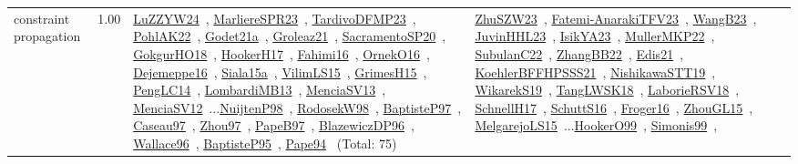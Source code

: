 {\begin{longtable}{p{3cm}r>{\raggedright\arraybackslash}p{6cm}>{\raggedright\arraybackslash}p{6cm}>{\raggedright\arraybackslash}p{8cm}}
\index{constraint propagation}\index{CP!constraint propagation}constraint propagation &  1.00 & \href{../works/LuZZYW24.pdf}{LuZZYW24}~\cite{LuZZYW24}, \href{../works/MarliereSPR23.pdf}{MarliereSPR23}~\cite{MarliereSPR23}, \href{../works/TardivoDFMP23.pdf}{TardivoDFMP23}~\cite{TardivoDFMP23}, \href{../works/PohlAK22.pdf}{PohlAK22}~\cite{PohlAK22}, \href{../works/Godet21a.pdf}{Godet21a}~\cite{Godet21a}, \href{../works/Groleaz21.pdf}{Groleaz21}~\cite{Groleaz21}, \href{../works/SacramentoSP20.pdf}{SacramentoSP20}~\cite{SacramentoSP20}, \href{../works/GokgurHO18.pdf}{GokgurHO18}~\cite{GokgurHO18}, \href{../works/HookerH17.pdf}{HookerH17}~\cite{HookerH17}, \href{../works/Fahimi16.pdf}{Fahimi16}~\cite{Fahimi16}, \href{../works/OrnekO16.pdf}{OrnekO16}~\cite{OrnekO16}, \href{../works/Dejemeppe16.pdf}{Dejemeppe16}~\cite{Dejemeppe16}, \href{../works/Siala15a.pdf}{Siala15a}~\cite{Siala15a}, \href{../works/VilimLS15.pdf}{VilimLS15}~\cite{VilimLS15}, \href{../works/GrimesH15.pdf}{GrimesH15}~\cite{GrimesH15}, \href{../works/PengLC14.pdf}{PengLC14}~\cite{PengLC14}, \href{../works/LombardiMB13.pdf}{LombardiMB13}~\cite{LombardiMB13}, \href{../works/MenciaSV13.pdf}{MenciaSV13}~\cite{MenciaSV13}, \href{../works/MenciaSV12.pdf}{MenciaSV12}~\cite{MenciaSV12}...\href{../works/NuijtenP98.pdf}{NuijtenP98}~\cite{NuijtenP98}, \href{../works/RodosekW98.pdf}{RodosekW98}~\cite{RodosekW98}, \href{../works/BaptisteP97.pdf}{BaptisteP97}~\cite{BaptisteP97}, \href{../works/Caseau97.pdf}{Caseau97}~\cite{Caseau97}, \href{../works/Zhou97.pdf}{Zhou97}~\cite{Zhou97}, \href{../works/PapeB97.pdf}{PapeB97}~\cite{PapeB97}, \href{../works/BlazewiczDP96.pdf}{BlazewiczDP96}~\cite{BlazewiczDP96}, \href{../works/Wallace96.pdf}{Wallace96}~\cite{Wallace96}, \href{../works/BaptisteP95.pdf}{BaptisteP95}~\cite{BaptisteP95}, \href{../works/Pape94.pdf}{Pape94}~\cite{Pape94} (Total: 75) & \href{../works/ZhuSZW23.pdf}{ZhuSZW23}~\cite{ZhuSZW23}, \href{../works/Fatemi-AnarakiTFV23.pdf}{Fatemi-AnarakiTFV23}~\cite{Fatemi-AnarakiTFV23}, \href{../works/WangB23.pdf}{WangB23}~\cite{WangB23}, \href{../works/JuvinHHL23.pdf}{JuvinHHL23}~\cite{JuvinHHL23}, \href{../works/IsikYA23.pdf}{IsikYA23}~\cite{IsikYA23}, \href{../works/MullerMKP22.pdf}{MullerMKP22}~\cite{MullerMKP22}, \href{../works/SubulanC22.pdf}{SubulanC22}~\cite{SubulanC22}, \href{../works/ZhangBB22.pdf}{ZhangBB22}~\cite{ZhangBB22}, \href{../works/Edis21.pdf}{Edis21}~\cite{Edis21}, \href{../works/KoehlerBFFHPSSS21.pdf}{KoehlerBFFHPSSS21}~\cite{KoehlerBFFHPSSS21}, \href{../works/NishikawaSTT19.pdf}{NishikawaSTT19}~\cite{NishikawaSTT19}, \href{../works/WikarekS19.pdf}{WikarekS19}~\cite{WikarekS19}, \href{../works/TangLWSK18.pdf}{TangLWSK18}~\cite{TangLWSK18}, \href{../works/LaborieRSV18.pdf}{LaborieRSV18}~\cite{LaborieRSV18}, \href{../works/SchnellH17.pdf}{SchnellH17}~\cite{SchnellH17}, \href{../works/SchuttS16.pdf}{SchuttS16}~\cite{SchuttS16}, \href{../works/Froger16.pdf}{Froger16}~\cite{Froger16}, \href{../works/ZhouGL15.pdf}{ZhouGL15}~\cite{ZhouGL15}, \href{../works/MelgarejoLS15.pdf}{MelgarejoLS15}~\cite{MelgarejoLS15}...\href{../works/HookerO99.pdf}{HookerO99}~\cite{HookerO99}, \href{../works/Simonis99.pdf}{Simonis99}~\cite{Simonis99}, 
\end{longtable}}
